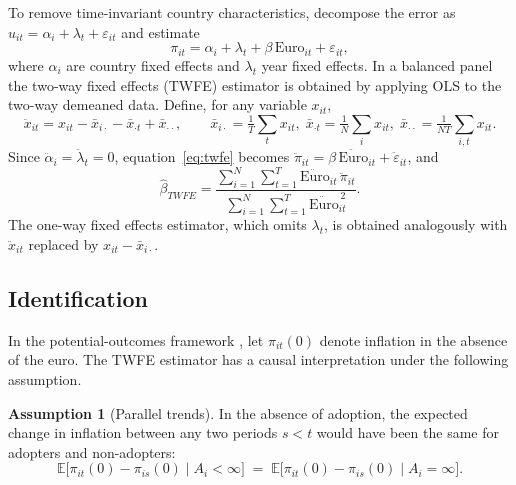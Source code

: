 \documentclass[11pt,a4paper]{article}
\numberwithin{equation}{section}
\theoremstyle{definition}
\newtheorem{assumption}{Assumption}
\theoremstyle{remark}
\begin{document}
To remove time-invariant country characteristics, decompose the error as $u_{it} = \alpha_i + \lambda_t + \varepsilon_{it}$ and estimate
\begin{equation}
\pi_{it} = \alpha_i + \lambda_t + \beta\,\text{Euro}_{it} + \varepsilon_{it},
\label{eq:twfe}
\end{equation}
where $\alpha_i$ are country fixed effects and $\lambda_t$ year fixed effects. In a balanced panel the two-way fixed effects (TWFE) estimator is obtained by applying OLS to the two-way demeaned data. Define, for any variable $x_{it}$,
\begin{equation}
\ddot{x}_{it} = x_{it} - \bar{x}_{i\cdot} - \bar{x}_{\cdot t} + \bar{x}_{\cdot\cdot},
\qquad
\bar{x}_{i\cdot} = \tfrac{1}{T}\textstyle\sum_t x_{it},\;
\bar{x}_{\cdot t} = \tfrac{1}{N}\textstyle\sum_i x_{it},\;
\bar{x}_{\cdot\cdot} = \tfrac{1}{NT}\textstyle\sum_{i,t} x_{it}.
\end{equation}
Since $\ddot{\alpha}_i = \ddot{\lambda}_t = 0$, equation~\eqref{eq:twfe} becomes $\ddot{\pi}_{it} = \beta\,\ddot{\text{Euro}}_{it} + \ddot{\varepsilon}_{it}$, and
\begin{equation}
\hat{\beta}_{TWFE} = \frac{\sum_{i=1}^{N}\sum_{t=1}^{T}\ddot{\text{Euro}}_{it}\,\ddot{\pi}_{it}}{\sum_{i=1}^{N}\sum_{t=1}^{T}\ddot{\text{Euro}}_{it}^{\,2}}.
\label{eq:betahat}
\end{equation}
The one-way fixed effects estimator, which omits $\lambda_t$, is obtained analogously with $\ddot{x}_{it}$ replaced by $x_{it}-\bar{x}_{i\cdot}$.

\subsection{Identification}
In the potential-outcomes framework \citep{angrist2009}, let $\pi_{it}(0)$ denote inflation in the absence of the euro. The TWFE estimator has a causal interpretation under the following assumption.

\begin{assumption}[Parallel trends]\label{ass:pt}
In the absence of adoption, the expected change in inflation between any two periods $s<t$ would have been the same for adopters and non-adopters:
\[
\mathbb{E}\big[\pi_{it}(0) - \pi_{is}(0)\mid A_i<\infty\big] \;=\; \mathbb{E}\big[\pi_{it}(0) - \pi_{is}(0)\mid A_i=\infty\big].
\]
\end{assumption}
\end{document}
